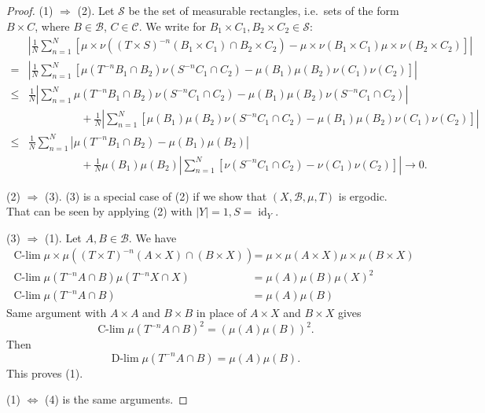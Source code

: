 \documentclass{article}
\DeclareMathOperator*{\dlim}{D-lim}
\DeclareMathOperator*{\clim}{C-lim}
\begin{document}
\begin{proof}
  (1) $\Rightarrow$ (2). Let $\mathcal{S}$ be the set of measurable rectangles, i.e.\ sets of the form $B \times C$, where $B \in \mathcal{B}$, $C \in \mathcal{C}$.
  We write for $B_1 \times C_1, B_2 \times C_2 \in \mathcal{S}$:
  \begin{align*}
    &\left|\frac{1}{N} \sum_{n=1}^N [\mu \times \nu((T \times S)^{-n} (B_1 \times C_1) \cap B_2 \times C_2) - \mu \times \nu (B_1 \times C_1) \mu \times \nu(B_2 \times C_2)]\right| \\
    =
    &\left|\frac{1}{N} \sum_{n=1}^N [\mu (T^{-n} B_1 \cap B_2) \nu(S^{-n} C_1 \cap C_2) - \mu(B_1) \mu(B_2) \nu(C_1) \nu(C_2)]\right| \\
    \leq & \frac{1}{N} \left| \sum_{n=1}^N \mu(T^{-n}B_1 \cap B_2) \nu(S^{-n} C_1 \cap C_2) - \mu(B_1) \mu(B_2) \nu(S^{-n}C_1 \cap C_2)\right| \\
         &\hspace{2cm} + \frac{1}{N} \left|\sum_{n=1}^N \left[\mu(B_1) \mu(B_2) \nu(S^{-n} C_1 \cap C_2) - \mu(B_1) \mu(B_2) \nu(C_1) \nu(C_2)\right] \right| \\
    \leq &\frac{1}{N} \sum_{n=1}^N |\mu(T^{-n} B_1 \cap B_2) - \mu(B_1) \mu(B_2)| \\
         &\hspace{2cm} + \frac{1}{N} \mu(B_1) \mu(B_2) \left|\sum_{n=1}^N \left[\nu(S^{-n} C_1 \cap C_2) - \nu(C_1) \nu(C_2)\right] \right|
    \to 0.
  \end{align*}

  (2) $\Rightarrow$ (3). (3) is a special case of (2) if we show that $(X, \mathcal{B}, \mu, T)$ is ergodic. That can be seen by applying (2) with $|Y| = 1, S = \operatorname{id}_Y$.

  (3) $\Rightarrow$ (1). Let $A, B \in \mathcal{B}$. We have
  \begin{align*}
    \clim \mu \times \mu ((T \times T)^{-n} (A \times X) \cap (B \times X)) &= \mu \times \mu(A \times X) \mu \times \mu(B \times X) \\
    \clim \mu(T^{-n} A \cap B) \mu(T^{-n} X \cap X) &= \mu(A) \mu(B) \mu(X)^2 \\
    \clim \mu(T^{-n} A \cap B) &= \mu(A) \mu(B)
  \end{align*}
  Same argument with $A \times A$ and $B \times B$ in place of $A \times X$ and $B \times X$ gives
  \begin{equation*}
    \clim \mu(T^{-n} A \cap B)^2 = (\mu(A) \mu(B))^2.
  \end{equation*}
  Then
  \begin{equation*}
    \dlim \mu(T^{-n} A \cap B) = \mu(A) \mu(B).
  \end{equation*}
  This proves (1).

  (1) $\Leftrightarrow$ (4) is the same arguments.

\end{proof}
\printindex
\end{document}
